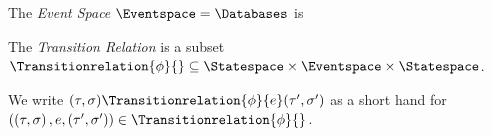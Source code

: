 \begin{definition}
    \label{def:enf-event-space}
    The \emph{Event Space} $\Eventspace=\Databases$ is 
\end{definition}

\begin{definition}
    \label{def:enf-transition-relation}
    The \emph{Transition Relation} is a subset
    $\Transitionrelation{\phi}{} \subseteq \Statespace \times \Eventspace \times \Statespace$.
\end{definition}
We write $(\tau, \sigma) \Transitionrelation{\phi}{e} (\tau', \sigma')$ as a short
hand for $\left(\left(\tau,\sigma\right), e, \left(\tau',\sigma'\right)\right) \in \Transitionrelation{\phi}{}$.